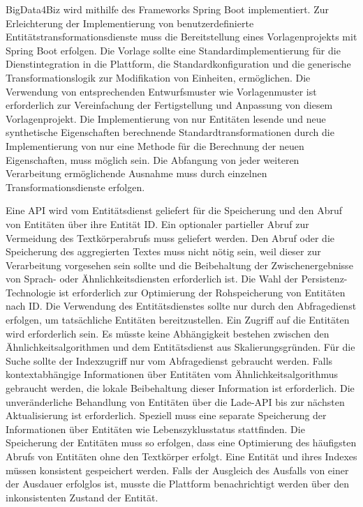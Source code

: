 BigData4Biz wird mithilfe des Frameworks Spring Boot implementiert. Zur Erleichterung der Implementierung von benutzerdefinierte Entitätstransformationsdienste muss die Bereitstellung eines Vorlagenprojekts mit Spring Boot erfolgen. Die Vorlage sollte eine Standardimplementierung für die Dienstintegration in die Plattform, die Standardkonfiguration und die generische Transformationslogik zur Modifikation von Einheiten, ermöglichen. Die Verwendung von entsprechenden Entwurfsmuster wie Vorlagenmuster ist erforderlich zur Vereinfachung der Fertigstellung und Anpassung von diesem Vorlagenprojekt. Die Implementierung von nur Entitäten lesende und neue synthetische Eigenschaften berechnende Standardtransformationen durch die Implementierung von nur eine Methode für die Berechnung der neuen Eigenschaften, muss möglich sein. Die Abfangung von jeder weiteren Verarbeitung ermöglichende Ausnahme muss durch einzelnen Transformationsdienste erfolgen.

Eine API wird vom Entitätsdienst geliefert für die Speicherung und den Abruf von Entitäten über ihre Entität ID. Ein optionaler partieller Abruf zur Vermeidung des Textkörperabrufs muss geliefert werden. Den Abruf oder die Speicherung des aggregierten Textes muss nicht nötig sein, weil dieser zur Verarbeitung vorgesehen sein sollte und die Beibehaltung der Zwischenergebnisse von Sprach- oder Ähnlichkeitsdiensten erforderlich ist. Die Wahl der Persistenz-Technologie ist erforderlich zur Optimierung der Rohspeicherung von Entitäten nach ID. Die Verwendung des Entitätsdienstes sollte nur durch den Abfragedienst erfolgen, um tatsächliche Entitäten bereitzustellen. Ein Zugriff auf die Entitäten wird erforderlich sein. Es müsste keine Abhängigkeit bestehen zwischen den Ähnlichkeitsalgorithmen und dem Entitätsdienst aus Skalierungsgründen. Für die Suche sollte der Indexzugriff nur vom Abfragedienst gebraucht werden. Falls kontextabhängige Informationen über Entitäten vom Ähnlichkeitsalgorithmus gebraucht werden, die lokale Beibehaltung dieser Information ist erforderlich. Die unveränderliche Behandlung von Entitäten über die Lade-API bis zur nächsten Aktualisierung ist erforderlich. Speziell muss eine separate Speicherung der Informationen über Entitäten wie Lebenszyklusstatus stattfinden. Die Speicherung der Entitäten muss so erfolgen, dass eine Optimierung des häufigsten Abrufs von Entitäten ohne den Textkörper erfolgt. Eine Entität und ihres Indexes müssen konsistent gespeichert werden. Falls der Ausgleich des Ausfalls von einer der Ausdauer erfolglos ist, musste die Plattform benachrichtigt werden über den inkonsistenten Zustand der Entität.

